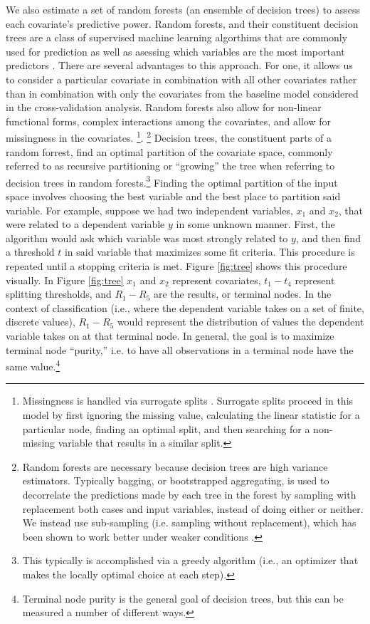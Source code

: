 \documentclass[12pt]{article}
\begin{document}
We also estimate a set of random forests (an ensemble of decision trees) to assess each covariate's predictive power. Random forests, and their constituent decision trees are a class of supervised machine learning algorthims that are commonly used for prediction as well as asessing which variables are the most important predictors  \citep[pp. 543-551]{murphy2012machine}.  There are several advantages to this approach. For one, it allows us to consider a particular covariate in combination with all other covariates rather than in combination with only the covariates from the baseline model considered in the cross-validation analysis. Random forests also allow for non-linear functional forms, complex interactions among the covariates, and allow for missingness in the covariates. \footnote{Missingness is handled via surrogate splits \citep{hothorn2006unbiased}. Surrogate splits proceed in this model by first ignoring the missing value, calculating the linear statistic for a particular node, finding an optimal split, and then searching for a non-missing variable that results in a similar split.}. 
\footnote{Random forests are necessary because decision trees are high variance estimators. Typically bagging, or bootstrapped aggregating, is used to decorrelate the predictions made by each tree in the forest by sampling with replacement both cases and input variables, instead of doing either or neither. We instead use sub-sampling (i.e. sampling without replacement), which has been shown to work better under weaker conditions \citep{politis-sub}.} Decision trees, the constituent parts of a random forrest, find an optimal partition of the covariate space, commonly referred to as recursive partitioning or ``growing'' the tree when referring to decision trees in random forests.\footnote{This typically is accomplished via a greedy algorithm (i.e., an optimizer that makes the locally optimal choice at each step).} Finding the optimal partition of the input space involves choosing the best variable and the best place to partition said variable. For example, suppose we had two independent variables, $x_1$ and $x_2$, that were related to a dependent variable $y$ in some unknown manner. First, the algorithm would ask which variable was most strongly related to $y$, and then find a threshold $t$ in said variable that maximizes some fit criteria. This procedure is repeated until a stopping criteria is met. Figure \ref{fig:tree} shows this procedure visually. In Figure \ref{fig:tree} $x_1$ and $x_2$ represent covariates, $t_1-t_4$ represent splitting thresholds, and $R_1-R_5$ are the results, or terminal nodes. In the context of classification (i.e., where the dependent variable takes on a set of finite, discrete values), $R_1-R_5$ would represent the distribution of values the dependent variable takes on at that terminal node. In general, the goal is to maximize terminal node ``purity,'' i.e. to have all observations in a terminal node have the same value.\footnote{Terminal node purity is the general goal of decision trees, but this can be measured a number of different ways.} 
\end{document}
